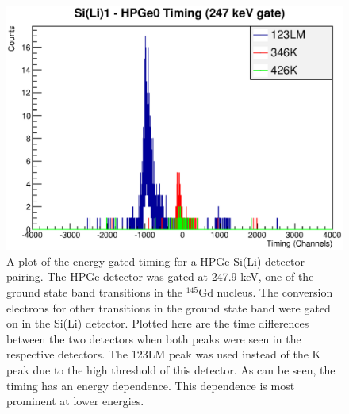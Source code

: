 \begin{figure}
    \centering
    \includegraphics[scale=0.7]{Analysis_Figs/TimingvEnergy.eps}
    \caption[Timing example for the GEORGINA setup]{A plot of the energy-gated timing for a HPGe-Si(Li) detector pairing. The HPGe detector was gated at 247.9 keV, one of the ground state band transitions in the $^{145}$Gd nucleus. The conversion electrons for other transitions in the ground state band were gated on in the Si(Li) detector. Plotted here are the time differences between the two detectors when both peaks were seen in the respective detectors. The 123LM peak was used instead of the K peak due to the high threshold of this detector. As can be seen, the timing has an energy dependence. This dependence is most prominent at lower energies.}
    \label{fig:timing_georgina}
\end{figure}